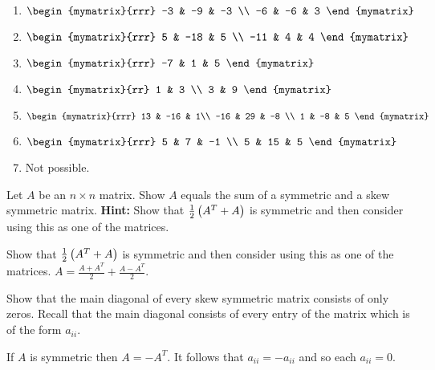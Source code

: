\begin{enumialphparenastyle}
\begin{ex}
\begin{sol}
\begin{enumerate}
\item $\begin{mymatrix}{rrr}
-3 & -9 & -3 \\
-6 & -6 & 3
\end{mymatrix}$
\item $\begin{mymatrix}{rrr}
5 & -18 & 5 \\
-11 & 4 & 4
\end{mymatrix}$
\item $\begin{mymatrix}{rrr}
-7 & 1 & 5
\end{mymatrix}$
\item $\begin{mymatrix}{rr}
1 & 3 \\
3 & 9
\end{mymatrix}$
\item $\begin{mymatrix}{rrr}
13 & -16 & 1\\
-16 & 29 & -8 \\
1 & -8 & 5
\end{mymatrix}$
\item $\begin{mymatrix}{rrr}
5 & 7 & -1 \\
5 & 15 & 5 
\end{mymatrix}$
\item Not possible.
\end{enumerate}
\end{sol}
\end{ex}

\begin{ex} Let $A$ be an $n\times n$ matrix. Show $A$ equals the sum of a
symmetric and a skew symmetric matrix.  
\textbf{Hint: }Show that $
\frac{1}{2}\left(A^{T}+A\right) $ is symmetric and then consider using this
as one of the matrices. 
\begin{sol}
Show that $\frac{1}{2}\left(A^{T}+A\right) $ is symmetric and then consider using this
as one of the matrices. $A=\frac{A+A^{T}}{2}+\frac{A-A^{T}}{2}.$
\end{sol}
\end{ex}

\begin{ex} Show that the main diagonal of every skew symmetric matrix consists of only zeros. Recall that the main diagonal consists of every entry of the matrix which is of the form
$a_{ii}$. 
\begin{sol}
If $A$ is symmetric then $A=-A^{T}.$ It follows that $a_{ii}=-a_{ii}$ and so each $a_{ii}=0$.
\end{sol}
\end{ex}


\end{enumialphparenastyle}
